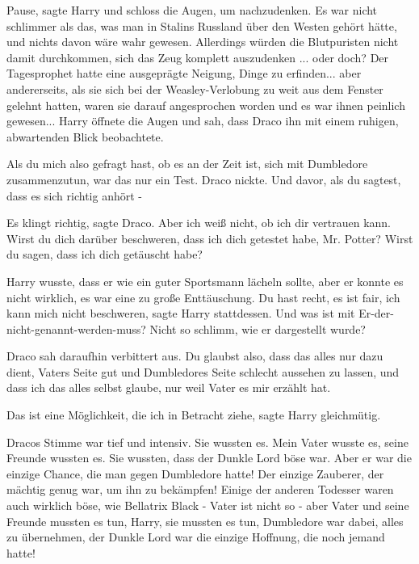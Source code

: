 \glqq Pause\grqq{}, sagte Harry und schloss die Augen, um nachzudenken. Es war
nicht schlimmer als das, was man in Stalins Russland über den Westen gehört
hätte, und nichts davon wäre wahr gewesen. Allerdings würden die Blutpuristen
nicht damit durchkommen, sich das Zeug komplett auszudenken ... oder doch? Der
Tagesprophet hatte eine ausgeprägte Neigung, Dinge zu erfinden... aber
andererseits, als sie sich bei der Weasley-Verlobung zu weit aus dem Fenster
gelehnt hatten, waren sie darauf angesprochen worden und es war ihnen peinlich
gewesen... Harry öffnete die Augen und sah, dass Draco ihn mit einem ruhigen,
abwartenden Blick beobachtete.

\glqq Als du mich also gefragt hast, ob es an der Zeit ist, sich mit Dumbledore
zusammenzutun, war das nur ein Test.\grqq{} Draco nickte. \glqq Und davor, als
du sagtest, dass es sich richtig anhört -\grqq{}

\glqq Es klingt richtig\grqq{}, sagte Draco. \glqq Aber ich weiß nicht, ob ich
dir vertrauen kann. Wirst du dich darüber beschweren, dass ich dich getestet
habe, Mr. Potter? Wirst du sagen, dass ich dich getäuscht habe?\grqq{}

Harry wusste, dass er wie ein guter Sportsmann lächeln sollte, aber er konnte es
nicht wirklich, es war eine zu große Enttäuschung. \glqq Du hast recht, es ist
fair, ich kann mich nicht beschweren\grqq{}, sagte Harry stattdessen. \glqq Und
was ist mit Er-der-nicht-genannt-werden-muss? Nicht so schlimm, wie er
dargestellt wurde?\grqq{}

Draco sah daraufhin verbittert aus. \glqq Du glaubst also, dass das alles nur
dazu dient, Vaters Seite gut und Dumbledores Seite schlecht aussehen zu lassen,
und dass ich das alles selbst glaube, nur weil Vater es mir erzählt hat.\grqq{}

\glqq Das ist eine Möglichkeit, die ich in Betracht ziehe\grqq{}, sagte Harry
gleichmütig.

Dracos Stimme war tief und intensiv. \glqq Sie wussten es. Mein Vater wusste es,
seine Freunde wussten es. Sie wussten, dass der Dunkle Lord böse war. Aber er
war die einzige Chance, die man gegen Dumbledore hatte! Der einzige Zauberer,
der mächtig genug war, um ihn zu bekämpfen! Einige der anderen Todesser waren
auch wirklich böse, wie Bellatrix Black - Vater ist nicht so - aber Vater und
seine Freunde mussten es tun, Harry, sie mussten es tun, Dumbledore war dabei,
alles zu übernehmen, der Dunkle Lord war die einzige Hoffnung, die noch jemand
hatte!\grqq{}

